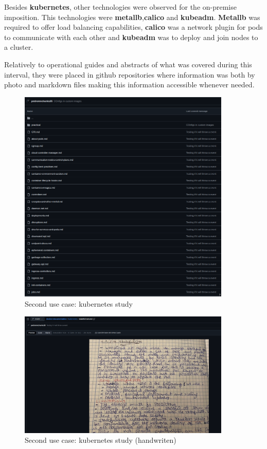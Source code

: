Besides \textbf{kubernetes}, other technologies were observed for the on-premise imposition. This technologies were \textbf{metallb},\textbf{calico} and \textbf{kubeadm}. \textbf{Metallb} was required to offer load balancing capabilities, \textbf{calico} was a network plugin for pods to communicate with each other and \textbf{kubeadm} was to deploy and join nodes to a cluster.

Relatively to operational guides and abstracts of what was covered during this interval, they were placed in github repositories where information was both by photo and markdown files making this information accessible whenever needed.

\begin{figure}[H]
    \centering
    \includegraphics[width=0.9\textwidth]{assets/use-case-2/kubernetes-study.png} %
    \caption{Second use case: kubernetes study}
    \label{fig:sample-image} 
\end{figure}

\begin{figure}[H]
    \centering
    \includegraphics[width=0.9\textwidth]{assets/use-case-2/kubernetes-study2.png} %
    \caption{Second use case: kubernetes study (handwriten)}
    \label{fig:sample-image} 
\end{figure}

